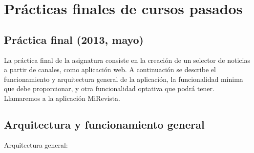 \newpage


\section{Prácticas finales de cursos pasados}

\subsection{Práctica final (2013, mayo)}
\label{practica-final-2013-05}

La práctica final de la asignatura consiste en la creación de un selector de noticias a partir de canales, como aplicación web. A continuación se describe el funcionamiento y arquitectura general de la aplicación, la funcionalidad mínima que debe proporcionar, y otra funcionalidad optativa que podrá tener. Llamaremos a la aplicación MiRevista.

\subsection{Arquitectura y funcionamiento general}

Arquitectura general:

